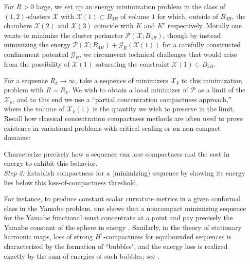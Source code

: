 \documentclass[10pt,reqno]{amsart}
\numberwithin{equation}{section}
\theoremstyle{definition}
\newcommand{\Pcal}{\mathcal{P}}
\newcommand{\cG}{\mathcal{G}}
\newcommand{\X}{\mathcal{X}}
\begin{document}
For $R>0$ large, we set up an energy minimization problem in the class of $(1,2)$-clusters $\X$ with $\X(1) \subset B_{3R}$ of volume $1$ for which, outside of $B_{3R}$, the chambers $\X(2)$ and $ \X(3)$ coincide with $K$ and $K^c$ respectively. Morally one wants to minimize the cluster perimeter $\mathcal{P}(\X; B_{4R})$, though by instead minimizing the energy $\mathcal{P}(\X; B_{4R}) + \cG_R(\X(1))$ for a carefully constructed confinement potential $\cG_R$, we circumvent technical challenges that would arise from the possibility of $\X(1)$ saturating the constraint $\X(1) \subset B_{3R}$.
\medskip


For a sequence $R_k \to \infty$, take a sequence of minimizers $\X_k$ to this minimization problem with $R=R_k$. We wish to obtain a local minimizer {of $\Pcal$} as a limit of the $\X_k$, and to this end we use a ``partial concentration compactness approach,'' where the volume of $\X_k(1)$ is the quantity we wish to preserve in the limit. Recall how classical concentration compactness methods are often used to prove existence in variational problems with critical scaling or on non-compact domains: 
\medskip


 Characterize precisely how a sequence can lose compactness and the cost in energy to exhibit this behavior.\\
{\it Step 2:} Establish compactness for a (minimizing) sequence by showing its energy lies below this loss-of-compactness threshold.
\medskip


For instance, to produce constant scalar curvature metrics in a given conformal class in the Yamabe problem, one shows that a noncompact minimizing sequence for the Yamabe functional must concentrate at a point and pay precisely the Yamabe constant of the sphere in energy \cite{LeeParker}. Similarly, in the theory of stationary harmonic maps, {loss of strong $H^1$-compactness for equibounded sequences is characterized by the formation of ``bubbles", and the energy loss is realized exactly by the sum of energies of such bubbles; see \cite{LinRiviere02,N-V-energy-identity}.}

\medskip
\end{document}
